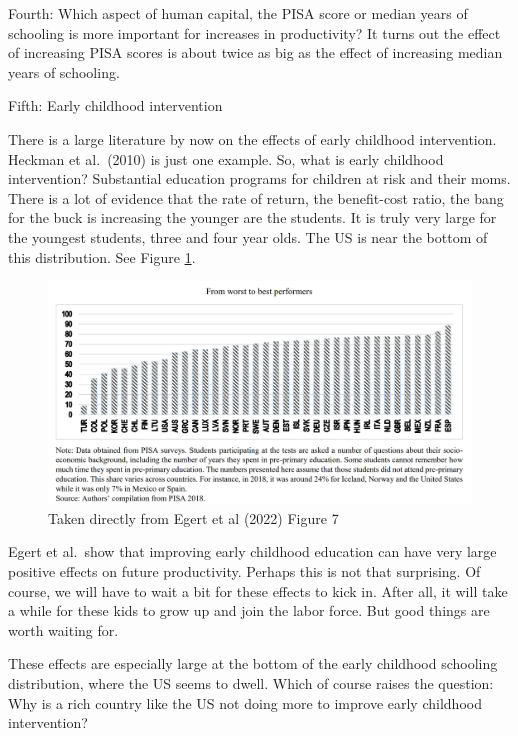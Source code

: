 \documentclass[
]{book}
\begin{document}
Fourth: Which aspect of human capital, the PISA score or median years of schooling is more important for increases in productivity? It turns out the effect of increasing PISA scores is about twice as big as the effect of increasing median years of schooling.

Fifth: Early childhood intervention

There is a large literature by now on the effects of early childhood intervention. Heckman et al.~(2010) is just one example. So, what is early childhood intervention? Substantial education programs for children at risk and their moms. There is a lot of evidence that the rate of return, the benefit-cost ratio, the bang for the buck is increasing the younger are the students. It is truly very large for the youngest students, three and four year olds. The US is near the bottom of this distribution. See Figure \ref{fig:egertfig7}.

\begin{figure}

{\centering \includegraphics[width=1\linewidth]{img/growth2/egertfig7} 

}

\caption{Taken directly from Egert et al (2022) Figure 7}\label{fig:egertfig7}
\end{figure}

Egert et al.~show that improving early childhood education can have very large positive effects on future productivity. Perhaps this is not that surprising. Of course, we will have to wait a bit for these effects to kick in. After all, it will take a while for these kids to grow up and join the labor force. But good things are worth waiting for.

These effects are especially large at the bottom of the early childhood schooling distribution, where the US seems to dwell. Which of course raises the question: Why is a rich country like the US not doing more to improve early childhood intervention?
\end{document}
